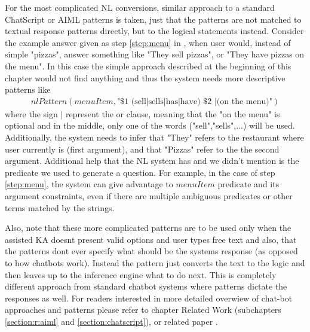 For the most complicated NL conversions, similar approach to a standard 
ChatScript or AIML patterns\parencite{Wilcox2011,Wallace2013} is taken, just 
that the patterns are not matched to textual response patterns directly, but 
to the logical statements instead. Consider the example answer given as step 
\ref{step:menu} in \autocite{tab:conversation1}, when user would, instead of 
simple "pizzas", answer something like "They sell pizzas", or "They have 
pizzas on the menu". In this case the simple approach described at the 
beginning of this chapter would not find anything and thus the system needs 
more descriptive patterns like
\begin{equation}\label{nl:complexPattern}
\begin{gathered}
nlPattern(menuItem,\text{"\$1 (sell|sells|has|have) \$2 |(on the menu)"})
\end{gathered}
\end{equation}
where the sign $|$ represent the or clause, meaning that the "on the menu" is
optional and in the middle, only one of the words ("sell","sells",...) will
be used. Additionally, the system needs to infer that "They" refers to the
restaurant where user currently is (first argument), and that "Pizzas" refer 
to the the second argument.
Additional help that the NL system has and we didn't mention is the predicate
we used to generate a question. For example, in the case of step 
\ref{step:menu}, the system can give advantage to $menuItem$ predicate and its
argument constraints, even if there are multiple ambiguous predicates or other
terms matched by the strings.

Also, note that these more complicated patterns are to be used only when the 
assisted KA doesnt present valid options and user types free text and also, that
the patterns dont ever specify what should be the systems response (as opposed
to how chatbots work). Instead the pattern just converts the text to the logic
and then leaves up to the inference engine what to do next. This is completely 
different approach from standard chatbot systems where patterns dictate the 
responses as well. For readers interested in more detailed overwiew of chat-bot
approaches and patterns please refer to chapter Related Work (subchapters
\ref{section:r:aiml} and \ref{section:chatscript}), or related paper
\parencite{Bradesko2012}.

